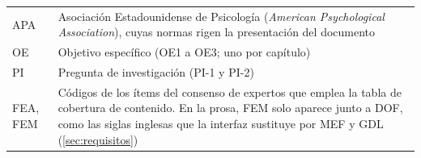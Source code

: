 \begin{longtable}{@{}p{2.4cm}p{11.4cm}@{}}
APA & Asociación Estadounidense de Psicología (\emph{American Psychological Association}), cuyas normas rigen la presentación del documento \\
OE & Objetivo específico (OE1 a OE3; uno por capítulo) \\
PI & Pregunta de investigación (PI-1 y PI-2) \\
FEA, FEM & Códigos de los ítems del consenso de expertos que emplea la tabla de cobertura de contenido. En la prosa, FEM solo aparece junto a DOF, como las siglas inglesas que la interfaz sustituye por MEF y GDL (\autoref{sec:requisitos}) \\
\end{longtable}
\renewcommand{\arraystretch}{1.0}

\setcounter{table}{0}
